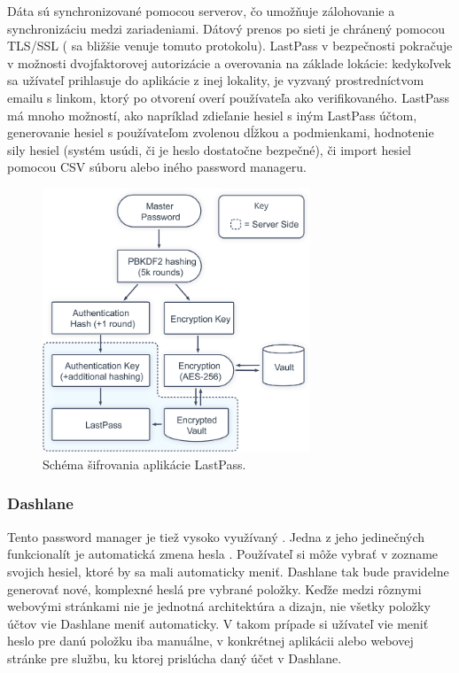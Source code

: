 Dáta sú synchronizované pomocou serverov, čo umožňuje zálohovanie a synchronizáciu medzi zariadeniami. Dátový prenos po sieti je chránený pomocou TLS/SSL (\cite{tls} sa bližšie venuje tomuto protokolu). LastPass v bezpečnosti pokračuje v možnosti dvojfaktorovej autorizácie a overovania na základe lokácie: kedykoľvek sa užívateľ prihlasuje do aplikácie z inej lokality, je vyzvaný prostredníctvom emailu s linkom, ktorý po otvorení overí používateľa ako verifikovaného. LastPass má mnoho možností, ako napríklad zdieľanie hesiel s iným LastPass účtom, generovanie hesiel s používateľom zvolenou dĺžkou a podmienkami, hodnotenie sily hesiel (systém usúdi, či je heslo dostatočne bezpečné), či import hesiel pomocou CSV súboru alebo iného password manageru.
\newline
\begin{figure}[ht]
  \centering
  \includegraphics[width=8cm]{img/lastpass.png}
  \caption{Schéma šifrovania aplikácie LastPass.}
\end{figure}

\subsubsection{Dashlane}
Tento password manager je tiež vysoko využívaný \cite{dashlane_10million_users}. Jedna z jeho jedinečných funkcionalít je automatická zmena hesla \cite{dashlane_password_changer}. Používateľ si môže vybrať v zozname svojich hesiel, ktoré by sa mali automaticky meniť. Dashlane tak bude pravidelne generovať nové, komplexné heslá pre vybrané položky. Keďže medzi rôznymi webovými stránkami nie je jednotná architektúra a dizajn, nie všetky položky účtov vie Dashlane meniť automaticky. V takom prípade si užívateľ vie meniť heslo pre danú položku iba manuálne, v konkrétnej aplikácii alebo webovej stránke pre službu, ku ktorej prislúcha daný účet v Dashlane.

